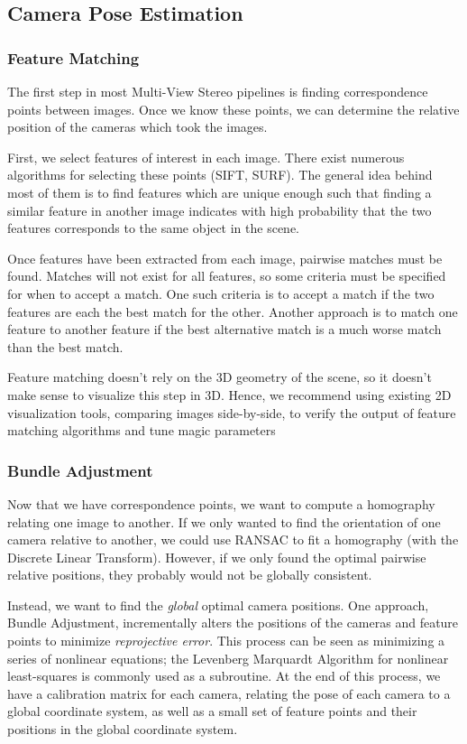 \documentclass[10pt,twocolumn,letterpaper]{article}
\begin{document}
\subsection{Camera Pose Estimation}

\subsubsection{Feature Matching}
The first step in most Multi-View Stereo pipelines is finding correspondence points between images. Once we know these points, we can determine the relative position of the cameras which took the images.

First, we select features of interest in each image. There exist numerous algorithms for selecting these points (SIFT, SURF). The general idea behind most of them is to find features which are unique enough such that finding a similar feature in another image indicates with high probability that the two features corresponds to the same object in the scene.\cite{brown}

Once features have been extracted from each image, pairwise matches must be found. Matches will not exist for all features, so some criteria must be specified for when to accept a match. One such criteria is to accept a match if the two features are each the best match for the other. Another approach is to match one feature to another feature if the best alternative match is a much worse match than the best match.\cite{brown}

Feature matching doesn't rely on the 3D geometry of the scene, so it doesn't make sense to visualize this step in 3D. Hence, we recommend using existing 2D visualization tools, comparing images side-by-side, to verify the output of feature matching algorithms and tune magic parameters

\subsubsection{Bundle Adjustment}

Now that we have correspondence points, we want to compute a homography relating one image to another. If we only wanted to find the orientation of one camera relative to another, we could use RANSAC to fit a homography (with the Discrete Linear Transform).\cite{ransac} However, if we only found the optimal pairwise relative positions, they probably would not be globally consistent.

Instead, we want to find the \emph{global} optimal camera positions. One approach, Bundle Adjustment, incrementally alters the positions of the cameras and feature points to minimize \emph{reprojective error}. This process can be seen as minimizing a series of nonlinear equations; the Levenberg Marquardt Algorithm for nonlinear least-squares is commonly used as a subroutine. At the end of this process, we have a calibration matrix for each camera, relating the pose of each camera to a global coordinate system, as well as a small set of feature points and their positions in the global coordinate system.\cite{snavely, sba}
\end{document}
